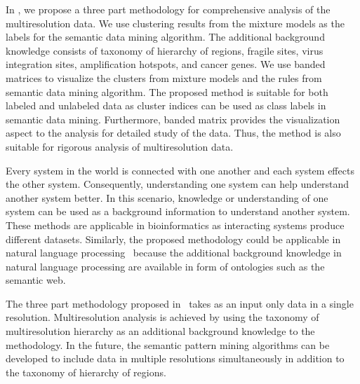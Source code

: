 In , we propose a three part methodology for comprehensive
analysis of the multiresolution data. We use clustering results from the
mixture models as the labels for the semantic data mining algorithm. 
The additional background knowledge consists of taxonomy of hierarchy
of regions, fragile sites, virus integration sites, amplification 
hotspots, and cancer genes. We use banded matrices to visualize the
clusters from mixture models and the rules from semantic data mining
algorithm. The proposed method is suitable for both labeled and 
unlabeled data as cluster indices can be used as class labels 
in semantic data mining. Furthermore, banded matrix provides the 
visualization aspect to the analysis for detailed study of the data. 
Thus, the method is also suitable for rigorous analysis of 
multiresolution data.

Every system in the world is connected with one another and 
each system effects the other system. Consequently, understanding
one system can help understand another system better. In this 
scenario, knowledge or understanding  of one system can be used 
as a background information to understand another system. These
methods are applicable in bioinformatics as interacting systems 
produce different datasets. Similarly, the proposed methodology 
could be applicable in natural language
processing~\cite{manning1999foundations} 
because the additional background  knowledge in natural language 
processing are available in form of ontologies such as the 
semantic web.

The three part methodology proposed in~ takes as an input only
data in a single resolution. Multiresolution analysis is achieved by using 
the taxonomy of multiresolution hierarchy as an additional background knowledge 
to the methodology. In the future, the semantic pattern mining algorithms
can be developed to include data in multiple resolutions simultaneously
in addition to the taxonomy of hierarchy of regions. 









